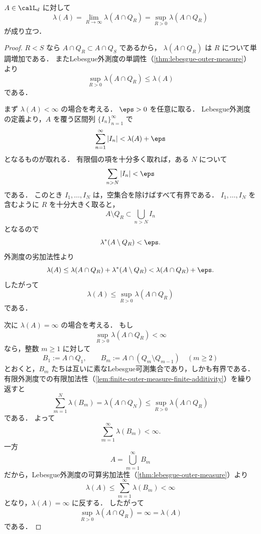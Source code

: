 \begin{lemma}[有界窓による近似]\label{lem:bounded-window-approximation}
$A\in\calL_d$ に対して
\[
\lambda(A)=\lim_{R\to\infty}\lambda(A\cap Q_R)
=\sup_{R>0}\lambda(A\cap Q_R)
\]
が成り立つ．
\end{lemma}
\begin{proof}
$R<S$ なら $A\cap Q_R\subset A\cap Q_S$ であるから，
$\lambda(A\cap Q_R)$ は $R$ について単調増加である．
またLebesgue外測度の単調性（\cref{thm:lebesgue-outer-measure}）より
\[
\sup_{R>0}\lambda(A\cap Q_R)\le \lambda(A)
\]
である．

まず $\lambda(A)<\infty$ の場合を考える．
$\eps>0$ を任意に取る．
Lebesgue外測度の定義より，$A$ を覆う区間列 $\{I_n\}_{n=1}^{\infty}$ で
\[
\sum_{n=1}^{\infty}|I_n|<\lambda(A)+\eps
\]
となるものが取れる．
有限個の項を十分多く取れば，ある $N$ について
\[
\sum_{n>N}|I_n|<\eps
\]
である．
このとき $I_1,\dots,I_N$ は，空集合を除けばすべて有界である．
$I_1,\dots,I_N$ を含むように $R$ を十分大きく取ると，
\[
A\setminus Q_R\subset\bigcup_{n>N}I_n
\]
となるので
\[
\lambda^*(A\setminus Q_R)<\eps.
\]
外測度の劣加法性より
\[
\lambda(A)
\le
\lambda(A\cap Q_R)+\lambda^*(A\setminus Q_R)
<
\lambda(A\cap Q_R)+\eps.
\]
したがって
\[
\lambda(A)\le \sup_{R>0}\lambda(A\cap Q_R)
\]
である．

次に $\lambda(A)=\infty$ の場合を考える．
もし
\[
\sup_{R>0}\lambda(A\cap Q_R)<\infty
\]
なら，整数 $m\ge1$ に対して
\[
B_1:=A\cap Q_1,
\qquad
B_m:=A\cap(Q_m\setminus Q_{m-1})\quad(m\ge2)
\]
とおくと，$B_m$ たちは互いに素なLebesgue可測集合であり，しかも有界である．
有限外測度での有限加法性（\cref{lem:finite-outer-measure-finite-additivity}）を繰り返すと
\[
\sum_{m=1}^{N}\lambda(B_m)
=
\lambda(A\cap Q_N)
\le
\sup_{R>0}\lambda(A\cap Q_R)
\]
である．
よって
\[
\sum_{m=1}^{\infty}\lambda(B_m)<\infty.
\]
一方
\[
A=\bigcup_{m=1}^{\infty}B_m
\]
だから，Lebesgue外測度の可算劣加法性（\cref{thm:lebesgue-outer-measure}）より
\[
\lambda(A)
\le
\sum_{m=1}^{\infty}\lambda(B_m)
<\infty
\]
となり，$\lambda(A)=\infty$ に反する．
したがって
\[
\sup_{R>0}\lambda(A\cap Q_R)=\infty=\lambda(A)
\]
である．
\end{proof}

